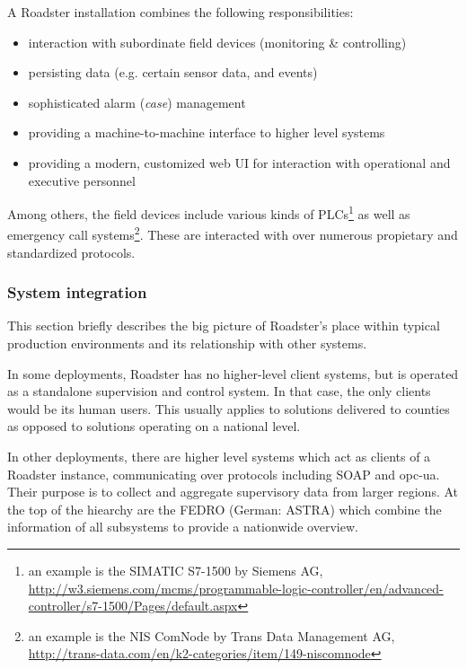 A Roadster installation combines the following responsibilities:

\begin{itemize}
	\item interaction with subordinate field devices (monitoring \& controlling)
	\item persisting data (e.g. certain sensor data, and events)
	\item sophisticated alarm (\emph{case}) management
	\item providing a machine-to-machine interface to higher level systems
	\item providing a modern, customized web UI for interaction with operational and executive personnel
\end{itemize}

Among others, the field devices include various kinds of \glspl{PLC}\footnote{an example
is the SIMATIC S7-1500 by Siemens AG,
\url{http://w3.siemens.com/mcms/programmable-logic-controller/en/advanced-controller/s7-1500/Pages/default.aspx}}
as well as emergency call systems\footnote{an example is the NIS ComNode by Trans Data
Management AG,
\url{http://trans-data.com/en/k2-categories/item/149-niscomnode}}.
These are interacted with over numerous propietary and standardized protocols.

\subsubsection{System integration}\label{sec:scope:sys-integration}
This section briefly describes the big picture of Roadster's place within
typical production environments and its relationship with other systems.

In some deployments, Roadster has no higher-level client systems, but is
operated as a standalone supervision and control system. In that case, the only
clients would be its human users. This usually applies to solutions delivered
to counties as opposed to solutions operating on a national level.

In other deployments, there are higher level systems which act as clients of a Roadster instance, communicating over
protocols including \gls{SOAP} and \gls{opc-ua}. Their purpose is to
collect and aggregate supervisory data from larger regions. At the top of the
hiearchy are the \gls{FEDRO} (German: \gls{ASTRA}) which combine the information of all
subsystems to provide a nationwide overview.

